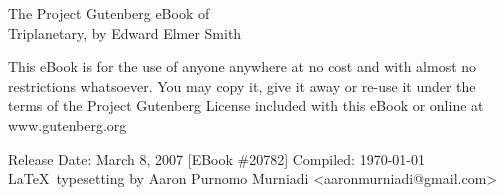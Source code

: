 \thispagestyle{empty}
{\small
\begin{center}
The Project Gutenberg eBook of\\Triplanetary, by Edward Elmer Smith
\end{center}
\vfill
This eBook is for the use of anyone anywhere at no cost and with
almost no restrictions whatsoever.  You may copy it, give it away or
re-use it under the terms of the Project Gutenberg License included
with this eBook or online at www.gutenberg.org
\vfill
\begin{center}
Release Date: March 8, 2007 [EBook \#20782]
\vfill
\vfill
Compiled: \today
\vfill
\vfill
\vfill
\vfill
\LaTeX\ typesetting by Aaron Purnomo Murniadi
\vfill
<aaronmurniadi@gmail.com>
\vfill
\end{center}
}
